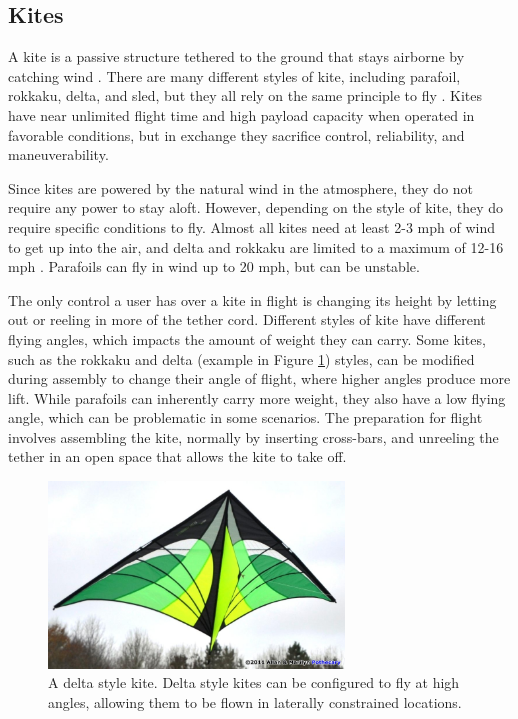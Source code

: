 \subsection{Kites}
A kite is a passive structure tethered to the ground that stays airborne by catching wind \cite{kite_book}. There are many different styles of kite, including parafoil, rokkaku, delta, and sled, but they all rely on the same principle to fly \cite{kite_book} \cite{kite_iqp}. Kites have near unlimited flight time and high payload capacity when operated in favorable conditions, but in exchange they sacrifice control, reliability, and maneuverability.\par
Since kites are powered by the natural wind in the atmosphere, they do not require any power to stay aloft. However, depending on the style of kite, they do require specific conditions to fly. Almost all kites need at least 2-3 mph of wind to get up into the air, and delta and rokkaku are limited to a maximum of 12-16 mph \cite{kite_iqp}. Parafoils can fly in wind up to 20 mph, but can be unstable.\par
The only control a user has over a kite in flight is changing its height by letting out or reeling in more of the tether cord. Different styles of kite have different flying angles, which impacts the amount of weight they can carry. Some kites, such as the rokkaku and delta (example in Figure \ref{fig:delta_kite}) styles, can be modified during assembly to change their angle of flight, where higher angles produce more lift. While parafoils can inherently carry more weight, they also have a low flying angle, which can be problematic in some scenarios. The preparation for flight involves assembling the kite, normally by inserting cross-bars, and unreeling the tether in an open space that allows the kite to take off.\par
\begin{figure}[ht]
\centering
\includegraphics[width=0.70\textwidth]{img/delta-kite.jpg}
\caption{A delta style kite. Delta style kites can be configured to fly at high angles, allowing them to be flown in laterally constrained locations.}
\label{fig:delta_kite}
\end{figure}\par
